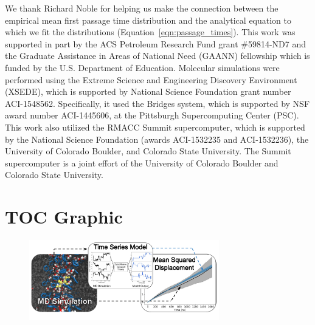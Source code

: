 \documentclass[journal=jctcce,manuscript=article]{achemso}
\begin{document}
  We thank Richard Noble for helping us make the connection between the empirical 
  mean first passage time distribution and the analytical equation to which we fit
  the distributions (Equation~\ref{eqn:passage_times}).
  This work was supported in part by the ACS Petroleum Research Fund grant
  \#59814-ND7 and the Graduate Assistance in Areas of National Need (GAANN)
  fellowship which is funded by the U.S. Department of Education.  Molecular
  simulations were performed using the Extreme Science and Engineering
  Discovery Environment (XSEDE), which is supported by National Science
  Foundation grant number ACI-1548562. Specifically, it used the Bridges
  system, which is supported by NSF award number ACI-1445606, at the Pittsburgh
  Supercomputing Center (PSC). This work also utilized the RMACC Summit
  supercomputer, which is supported by the National Science Foundation (awards
  ACI-1532235 and ACI-1532236), the University of Colorado Boulder, and
  Colorado State University. The Summit supercomputer is a joint effort of the
  University of Colorado Boulder and Colorado State University.

  

  \section*{TOC Graphic}
    
  \begin{figure}[!htb]
  \centering
  \includegraphics[width=3.25in]{toc.pdf}
  \end{figure}
\end{document}
